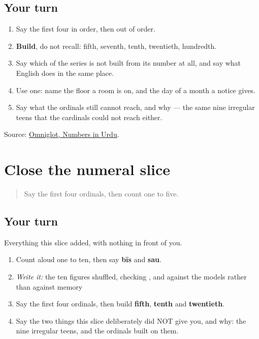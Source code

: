 \subsection*{Your turn}
\begin{enumerate}
\raggedright
  \item Say the first four in order, then out of order.
  \item \textbf{Build}, do not recall: fifth, seventh, tenth, twentieth, hundredth.
  \item Say which of the series is not built from its number at all, and say what English does in the same place.
  \item Use one: name the floor a room is on, and the day of a month a notice gives.
  \item Say what the ordinals still cannot reach, and why — the same nine irregular teens that the cardinals could not reach either.
\end{enumerate}

\begin{tcolorbox}[breakable,colback=teal!4,colframe=teal!35!black,title={Before you move on}]
Source: \href{https://www.omniglot.com/language/numbers/urdu.htm}{Omniglot, Numbers in Urdu}.
\end{tcolorbox}
\section[Practice]{Close the numeral slice}

\label{lesson:UR-R32-close}



\begin{quote}
Say the first four ordinals, then count one to five.
\end{quote}

\subsection*{Your turn}
Everything this slice added, with nothing in front of you.

\begin{enumerate}
\raggedright
  \item Count aloud one to ten, then say \textbf{bīs} and \textbf{sau}.
  \item \emph{Write it:} the ten figures shuffled, checking \textbf{}, \textbf{} and \textbf{} against the models rather than against memory
  \item Say the first four ordinals, then build \textbf{fifth}, \textbf{tenth} and \textbf{twentieth}.
  \item Say the two things this slice deliberately did NOT give you, and why: the nine irregular teens, and the ordinals built on them.
\end{enumerate}

